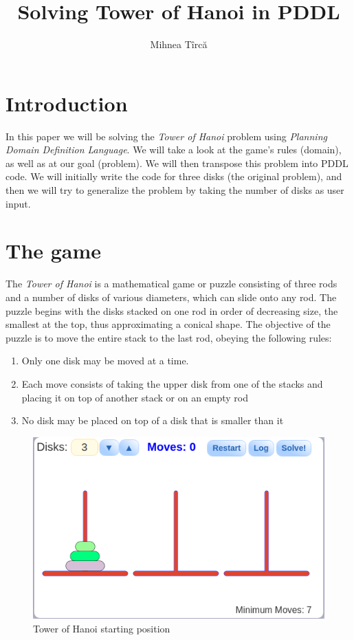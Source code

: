 \documentclass{article}
\title{Solving Tower of Hanoi in PDDL}
\author{Mihnea Tîrcă}
\begin{document}
\maketitle

\tableofcontents
\pagebreak

\section{Introduction}

In this paper we will be solving the \emph{Tower of Hanoi} problem using \emph{Planning Domain Definition Language}. We will take a look at the game's rules (domain), as well as at our goal (problem). We will then transpose this problem into PDDL code. We will initially write the code for three disks (the original problem), and then we will try to generalize the problem by taking the number of disks as user input.

\section{The game}
The \emph{Tower of Hanoi} is a mathematical game or puzzle consisting of three rods and a number of disks of various diameters, which can slide onto any rod. The puzzle begins with the disks stacked on one rod in order of decreasing size, the smallest at the top, thus approximating a conical shape. The objective of the puzzle is to move the entire stack to the last rod, obeying the following rules:

\begin{enumerate}
    \item Only one disk may be moved at a time.
    \item Each move consists of taking the upper disk from one of the stacks and placing it on top of another stack or on an empty rod
    \item No disk may be placed on top of a disk that is smaller than it
\end{enumerate}

\begin{figure}[h!]
    \centering
    \includegraphics[scale=0.5]{"images/Initial_Position.png"}
    \caption{Tower of Hanoi starting position}
    \label{fig:init}
\end{figure}
\end{document}
